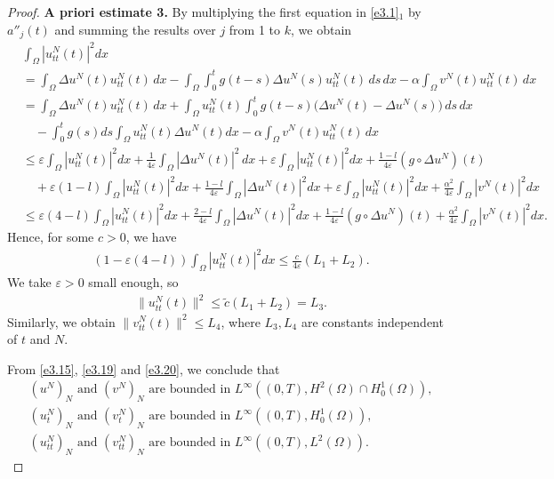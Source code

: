 \documentclass[11pt]{article}
\numberwithin{equation}{section}
\begin{document}
\begin{proof}
\noindent\textbf{A priori estimate 3.}
 By multiplying the first equation in \eqref{e3.1}$_1$ by
 \(a''_j(t)\) and summing the results over \(j\) from 1 to \(k\), we obtain
\begin{align*}
&\int_\Omega |u_{tt}^N(t)|^2 dx \\
& = \int_\Omega \Delta u^N(t) u_{tt}^N(t) \, dx
 - \int_\Omega \int_0^t g(t-s) \Delta u^N(s) u_{tt}^N(t) \, ds\,dx
 - \alpha \int_\Omega v^N(t) u_{tt}^N(t) \, dx\\
& = \int_\Omega \Delta u^N(t) u_{tt}^N(t) \, dx
 + \int_\Omega u_{tt}^N(t) \int_0^t g(t-s) \Big(\Delta u^N(t)- \Delta u^N(s)\Big)\, ds\,dx\\
&\quad -\int_0^t g(s) ds \int_\Omega u_{tt}^N(t) \Delta u^N(t) dx
 - \alpha \int_\Omega v^N(t) u_{tt}^N(t) \, dx\\
&\leq \varepsilon \int_\Omega |u_{tt}^N(t)|^2 dx
 +\frac{1}{4\varepsilon}\int_\Omega |\Delta u^N(t)|^2 \, dx
 + \varepsilon \int_\Omega |u_{tt}^N(t)|^2 dx+\frac{1-l}{4\varepsilon}
 (g \circ \Delta u^N)(t)\\
&\quad +\varepsilon(1-l) \int_\Omega |u_{tt}^N(t)|^2 dx
 + \frac{1-l}{4\varepsilon} \int_\Omega |\Delta u^N(t)|^2dx
 + \varepsilon \int_\Omega |u_{tt}^N(t)|^2 dx
 +\frac{\alpha^2}{4\varepsilon}\int_\Omega |v^N(t)|^2 dx \\
&\leq \varepsilon (4-l)\int_\Omega |u_{tt}^N(t)|^2 dx
 +\frac{2-l}{4\varepsilon} \int_\Omega |\Delta u^N(t)|^2dx+
 \frac{1-l}{4\varepsilon} (g \circ \Delta u^N)(t)
 +\frac{\alpha^2}{4\varepsilon}\int_\Omega |v^N(t)|^2 dx.
\end{align*}
Hence, for some $c >0$, we have
\begin{align}
\left(1-\varepsilon(4-l)\right) \int_\Omega |u_{tt}^N(t)|^2 dx
\leq \frac{c}{4\varepsilon}(L_1+L_2).
\end{align}
We take $\varepsilon >0$ small enough, so
\begin{align}
\|u_{tt}^N(t)\|^2 \leq \tilde{c}(L_1+L_2)=L_3. \label{e3.20}
\end{align}
Similarly, we obtain $\|v_{tt}^N(t)\|^2 \leq L_4$, where $L_{3}, L_{4} $
are constants independent of $t$ and $N$.

From \eqref{e3.15}, \eqref{e3.19} and \eqref{e3.20}, we conclude that
\begin{equation} \label{e3.21}
\begin{gathered}
(u^{N})_{N} \text{ and } (v^N)_{N} \text{ are bounded in }
L^\infty((0,T), H^2(\Omega) \cap H_0^1 (\Omega)),\\
(u^N_{t})_{N} \text{ and } (v^N_{t})_{N} \text{ are bounded in }
L^\infty((0,T), H^1_0(\Omega)), \\
(u^N_{tt})_{N} \text{ and } (v^N_{tt})_{N} \text{ are bounded in }
 L^\infty((0,T), L^2(\Omega)).
\end{gathered}
\end{equation}


\end{proof}
\end{document}
